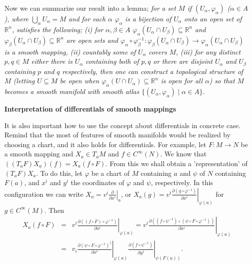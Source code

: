\documentclass{article}
\newcommand{\ReR}{\mathbb{R}}
\newcommand{\SBar}{\;|\;}
\newcommand{\parderbar}[3]{\left. \frac{\partial #1}{\partial #2} \right|_{#3}}
\begin{document}
Now we can summarize our result into a lemma; \textit{for a set $M$ if $(U_\alpha, \varphi_\alpha)$ ($\alpha \in A$), where $\bigcup_\alpha U_\alpha = M$ and for each $\alpha$ $\varphi_\alpha$ is a bijection of $U_\alpha$ onto an open set of $\ReR^n$, satisfies the following; (i) for $\alpha, \beta \in A$ $\varphi_\alpha(U_\alpha \cap U_\beta) \subseteq \ReR^n$ and $\varphi_\beta(U_\alpha \cap U_\beta) \subseteq \ReR^n$ are open sets and $\varphi_\alpha \circ \varphi_\beta^{-1} : \varphi_\beta(U_\alpha \cap U_\beta) \to \varphi_\alpha(U_\alpha \cap U_\beta)$ is a smooth mapping, (ii) countably some of $U_\alpha$ covers $M$, (iii) for any distinct $p, q \in M$ either there is $U_\alpha$ containing both of $p, q$ or there are disjoint $U_\alpha$ and $U_\beta$ containing $p$ and $q$ respectively, then one can construct a topological structure of $M$ (letting $U \subseteq M$ be open when $\varphi_\alpha(U \cap U_\alpha) \subseteq \ReR^n$ is open for all $\alpha$) so that $M$ becomes a smooth manifold with smooth atlas $\{(U_\alpha, \varphi_\alpha) \SBar \alpha \in A\}$}.

\newpage



\newpage

\textbf{Interpretation of differentials of smooth mappings}

It is also important how to use the concept about differentials in concrete case.
Remind that the most of features of smooth manifolds would be realized by choosing a chart, and it also holds for differentials.
For example, let $F : M \to N$ be a smooth mapping and $X_a \in T_a M$ and $f \in C^\infty(N)$.
We know that $((T_a F) X_a)(f) = X_a(f \circ F)$.
From this we shall obtain a 'representation' of $(T_a F) X_a$.
To do this, let $\varphi$ be a chart of $M$ containing $a$ and $\psi$ of $N$ containing $F(a)$, and $x^i$ and $y^i$ the coordinates of $\varphi$ and $\psi$, respectively.
In this configuration we can write $X_a = v^i \parderbar{}{x^i}{a}$, or $X_a(g) = v^i \parderbar{(g \circ \varphi^{-1})}{x^i}{\varphi(a)}$ for $g \in C^\infty(M)$.
Then 
\begin{eqnarray*}
  X_a(f \circ F) &=& v^i \parderbar{((f \circ F) \circ \varphi^{-1})}{x^i}{\varphi(a)} = v^i \parderbar{((f \circ \psi^{-1}) \circ (\psi \circ F \circ \varphi^{-1}))}{x^i}{\varphi(a)} \\
  &=& v_i \parderbar{(\psi \circ F \circ \varphi^{-1})^j}{x^i}{\varphi(a)} \parderbar{(f \circ \psi^{-1})}{y^j}{\psi(F(a))}.
\end{eqnarray*}
\end{document}
